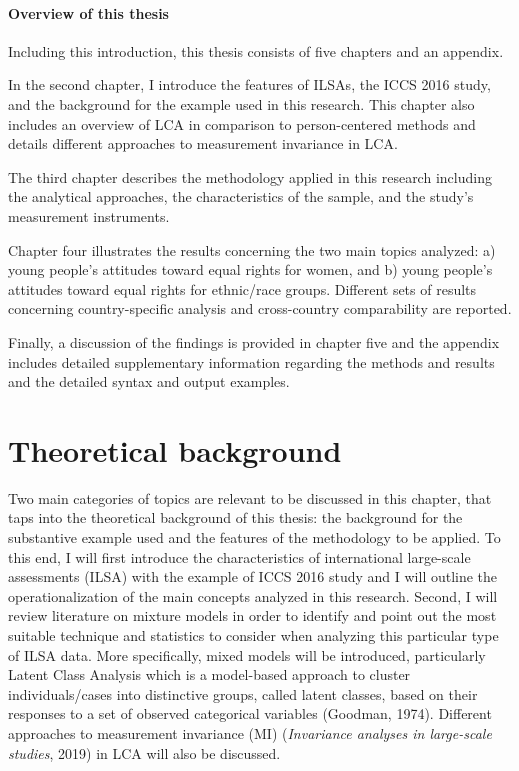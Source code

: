 \documentclass[12pt,a4paper,oneside]{reedthesis}
\begin{document}
\newpage

\hypertarget{overview-of-this-thesis}{%
\subsubsection{Overview of this thesis}\label{overview-of-this-thesis}}

Including this introduction, this thesis consists of five chapters and an appendix.

In the second chapter, I introduce the features of ILSAs, the ICCS 2016 study, and the background for the example used in this research. This chapter also includes an overview of LCA in comparison to person-centered methods and details different approaches to measurement invariance in LCA.

The third chapter describes the methodology applied in this research including the analytical approaches, the characteristics of the sample, and the study's measurement instruments.

Chapter four illustrates the results concerning the two main topics analyzed: a) young people's attitudes toward equal rights for women, and b) young people's attitudes toward equal rights for ethnic/race groups. Different sets of results concerning country-specific analysis and cross-country comparability are reported.

Finally, a discussion of the findings is provided in chapter five and the appendix includes detailed supplementary information regarding the methods and results and the detailed syntax and output examples.

\clearpage

\hypertarget{theoretical-background}{%
\chapter{Theoretical background}\label{theoretical-background}}

Two main categories of topics are relevant to be discussed in this chapter, that taps into the theoretical background of this thesis: the background for the substantive example used and the features of the methodology to be applied. To this end, I will first introduce the characteristics of international large-scale assessments (ILSA) with the example of ICCS 2016 study and I will outline the operationalization of the main concepts analyzed in this research. Second, I will review literature on mixture models in order to identify and point out the most suitable technique and statistics to consider when analyzing this particular type of ILSA data. More specifically, mixed models will be introduced, particularly Latent Class Analysis which is a model-based approach to cluster individuals/cases into distinctive groups, called latent classes, based on their responses to a set of observed categorical variables (Goodman, 1974). Different approaches to measurement invariance (MI) (\emph{Invariance analyses in large-scale studies}, 2019) in LCA will also be discussed.
\end{document}

